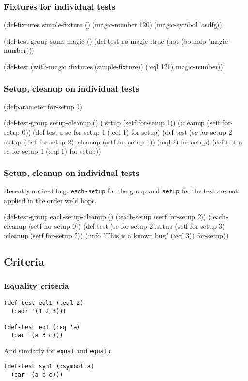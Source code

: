 \documentclass{beamer}
\begin{document}
\begin{frame}[fragile]
  \frametitle{Fixtures for individual tests}
\begin{semiverbatim}
(def-fixtures simple-fixture ()
  (magic-number 120)
  (magic-symbol 'asdfg))

(def-test-group some-magic ()
  (def-test no-magic :true
    \alert{(not (boundp 'magic-number))})

  (def-test (with-magic
             \alert{:fixtures (simple-fixture)})
      (:eql 120)
    \alert{magic-number}))
\end{semiverbatim}
\end{frame}

\begin{frame}[fragile]
  \frametitle{Setup, cleanup on individual tests}
{\small
\begin{semiverbatim}
(defparameter for-setup 0)

(def-test-group setup-cleanup ()
  (:setup (setf for-setup 1))
  (:cleanup (setf for-setup 0))
  (def-test a-sc-for-setup-1 (:eql 1) for-setup)
  (def-test (sc-for-setup-2
             :setup (setf for-setup 2)
             :cleanup (setf for-setup 1))
      (:eql 2)
    for-setup)
  (def-test z-sc-for-setup-1 (:eql 1) for-setup))
\end{semiverbatim}}
\end{frame}

\begin{frame}[fragile]
  \frametitle{Setup, cleanup on individual tests}

  Recently noticed bug: \texttt{each-setup} for the group and
  \texttt{setup} for the test are not applied in the order we'd hope.
  {\small
\begin{semiverbatim}
(def-test-group each-setup-cleanup ()
  (:each-setup (setf for-setup 2))
  (:each-cleanup (setf for-setup 0))
  (def-test (sc-for-setup-2
             :setup (setf for-setup 3)
             :cleanup (setf for-setup 2))
      (:info "This is a known bug" (:eql 3))
    for-setup))
\end{semiverbatim}}
\end{frame}

\subsection{Criteria}

\begin{frame}[fragile]
  \frametitle{Equality criteria}
\begin{verbatim}
(def-test eql1 (:eql 2)
  (cadr '(1 2 3)))

(def-test eq1 (:eq 'a)
  (car '(a 3 c)))
\end{verbatim}
And similarly for \texttt{equal} and \texttt{equalp}.
\begin{verbatim}
(def-test sym1 (:symbol a)
  (car '(a b c)))
\end{verbatim}
\end{frame}
\end{document}
